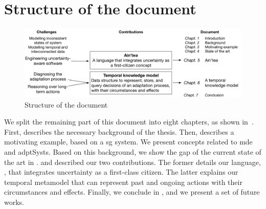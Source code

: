 \section{Structure of the document}

\begin{figure}
	\includegraphics[width=\linewidth]{img/chapt-intro/struct/struct}
	\caption{Structure of the document}
	\label{fig:intro:structDoc}
\end{figure}

We split the remaining part of this document into eight chapters, as shown in~.
First,  describes the necessary background of the thesis.
Then,  describes a motivating example, based on a \gls{sg} system.
We present concepts related to \gls{mde} and \glspl{adptSyst}.
Based on this background, we show the gap of the current state of the art in .
 and  described our two contributions.
The former details our language, \langName, that integrates uncertainty as a first-class citizen.
The latter explains our temporal \gls{metamodel} that can represent past and ongoing \glspl{action} with their circumstances and effects.
Finally, we conclude in , and we present a set of future works.
